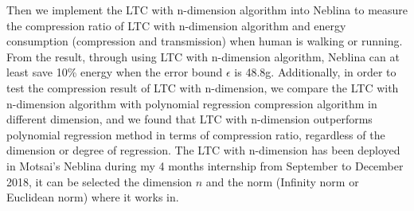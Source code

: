 Then we implement the LTC with n-dimension algorithm into Neblina to measure the
compression ratio of LTC with n-dimension algorithm and energy consumption
(compression and transmission) when human is walking or running. From the
result, through using LTC with n-dimension algorithm, Neblina can at least save
10\% energy when the error bound $\epsilon$ is 48.8g. Additionally, in order to
test the compression result of LTC with n-dimension, we compare the LTC with
n-dimension algorithm with polynomial regression compression algorithm in
different dimension, and we found that LTC with n-dimension outperforms
polynomial regression method in terms of compression ratio, regardless of the
dimension or degree of regression.
The LTC with n-dimension has been deployed in Motsai's Neblina during my 4
months internship from September to December 2018, it can be selected the
dimension $n$ and the norm (Infinity norm or Euclidean norm) where it works in.


% 
% 





